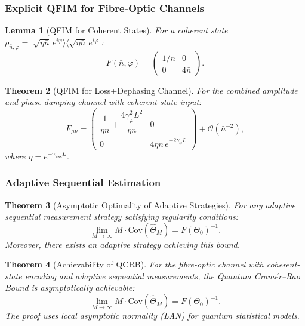 \documentclass[12pt,a4paper]{article}
\theoremstyle{definition}
\theoremstyle{plain}
\newtheorem{theorem}{Theorem}[section]
\newtheorem{lemma}[theorem]{Lemma}
\begin{document}
\subsubsection{Explicit QFIM for Fibre-Optic Channels}

\begin{lemma}[QFIM for Coherent States]
For a coherent state $\rho_{\bar{n},\varphi}=|\sqrt{\eta\bar{n}}\,e^{i\varphi}\rangle\langle\sqrt{\eta\bar{n}}\,e^{i\varphi}|$:
\begin{equation}
F(\bar{n},\varphi)=\begin{pmatrix}1/\bar{n}&0\\0&4\bar{n}\end{pmatrix}.
\end{equation}
\end{lemma}

\begin{theorem}[QFIM for Loss+Dephasing Channel]
For the combined amplitude and phase damping channel with coherent-state input:
\begin{equation}
F_{\mu\nu}=
\begin{pmatrix}
\dfrac{1}{\eta\bar{n}}+\dfrac{4\gamma_\varphi^2 L^2}{\eta\bar{n}} & 0\\[8pt]
0 & 4\eta\bar{n}\,e^{-2\gamma_\varphi L}
\end{pmatrix}+\mathcal{O}(\bar{n}^{-2}),
\end{equation}
where $\eta=e^{-\gamma_{\mathrm{loss}}L}$.
\end{theorem}

\subsubsection{Adaptive Sequential Estimation}

\begin{theorem}[Asymptotic Optimality of Adaptive Strategies]
For any adaptive sequential measurement strategy satisfying regularity conditions:
\begin{equation}
\lim_{M\to\infty}M\cdot\mathrm{Cov}(\hat\Theta_M)=F(\Theta_0)^{-1}.
\end{equation}
Moreover, there exists an adaptive strategy achieving this bound.
\end{theorem}

\begin{theorem}[Achievability of QCRB]
For the fibre-optic channel with coherent-state encoding and adaptive sequential
measurements, the Quantum Cram\'er--Rao Bound is asymptotically achievable:
\begin{equation}
\lim_{M\to\infty}M\cdot\mathrm{Cov}(\hat\Theta_M)=F(\Theta_0)^{-1}.
\end{equation}
The proof uses local asymptotic normality (LAN) for quantum statistical models.
\end{theorem}
\end{document}
